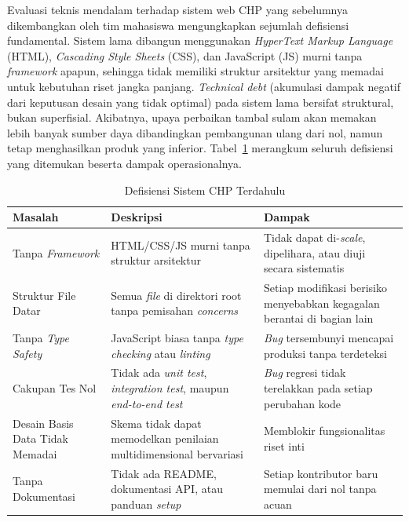 Evaluasi teknis mendalam terhadap sistem web CHP yang sebelumnya dikembangkan oleh tim mahasiswa mengungkapkan sejumlah defisiensi fundamental. Sistem lama dibangun menggunakan \textit{HyperText Markup Language} (HTML), \textit{Cascading Style Sheets} (CSS), dan JavaScript (JS) murni tanpa \textit{framework} apapun, sehingga tidak memiliki struktur arsitektur yang memadai untuk kebutuhan riset jangka panjang. \textit{Technical debt} (akumulasi dampak negatif dari keputusan desain yang tidak optimal) pada sistem lama bersifat struktural, bukan superfisial. Akibatnya, upaya perbaikan tambal sulam akan memakan lebih banyak sumber daya dibandingkan pembangunan ulang dari nol, namun tetap menghasilkan produk yang inferior. Tabel~\ref{tab:defisiensi} merangkum seluruh defisiensi yang ditemukan beserta dampak operasionalnya.

\begin{table}[htbp]
  \centering
  \caption{Defisiensi Sistem CHP Terdahulu}
  \label{tab:defisiensi}
  \begin{tabularx}{\textwidth}{@{}l X X@{}}
    \toprule
    \textbf{Masalah} & \textbf{Deskripsi} & \textbf{Dampak} \\
    \midrule
    Tanpa \textit{Framework} & HTML/CSS/JS murni tanpa struktur arsitektur & Tidak dapat di-\textit{scale}, dipelihara, atau diuji secara sistematis \\
    Struktur File Datar & Semua \textit{file} di direktori root tanpa pemisahan \textit{concerns} & Setiap modifikasi berisiko menyebabkan kegagalan berantai di bagian lain \\
    Tanpa \textit{Type Safety} & JavaScript biasa tanpa \textit{type checking} atau \textit{linting} & \textit{Bug} tersembunyi mencapai produksi tanpa terdeteksi \\
    Cakupan Tes Nol & Tidak ada \textit{unit test}, \textit{integration test}, maupun \textit{end-to-end test} & \textit{Bug} regresi tidak terelakkan pada setiap perubahan kode \\
    Desain Basis Data Tidak Memadai & Skema tidak dapat memodelkan penilaian multidimensional bervariasi & Memblokir fungsionalitas riset inti \\
    Tanpa Dokumentasi & Tidak ada README, dokumentasi API, atau panduan \textit{setup} & Setiap kontributor baru memulai dari nol tanpa acuan \\
    \bottomrule
  \end{tabularx}
\end{table}

